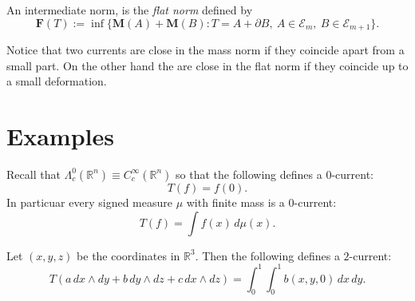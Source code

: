 \documentclass[12pt]{article}
\newcommand{\R}{\mathbb R}
\begin{document}
An intermediate norm, is the \emph{flat norm} defined by
\[
  \mathbf F (T) := \inf \{\mathbf M(A) + \mathbf M(B) \colon
    T= A + \partial B,\ A\in\mathcal E_m,\ B\in\mathcal E_{m+1}\}.
\]

Notice that two currents are close in the mass norm if they coincide apart from 
a small part. On the other hand the are close in the flat norm if they coincide up to a small deformation.


\section*{Examples}
Recall that $\Lambda_c^0(\R^n)\equiv C^\infty_c(\R^n)$ so that the following defines a $0$-current:
\[
  T(f) = f(0). 
\]
In particuar every signed measure $\mu$ with finite mass is a $0$-current:
\[
  T(f) = \int f(x)\, d\mu(x).
\]

Let $(x,y,z)$ be the coordinates in $\R^3$. Then the following defines a $2$-current:
\[
T(a\,dx\wedge dy + b\,dy\wedge dz + c\,dx\wedge dz) = 
 \int_0^1 \int_0^1 b(x,y,0)\, dx \, dy.
\]
\end{document}
